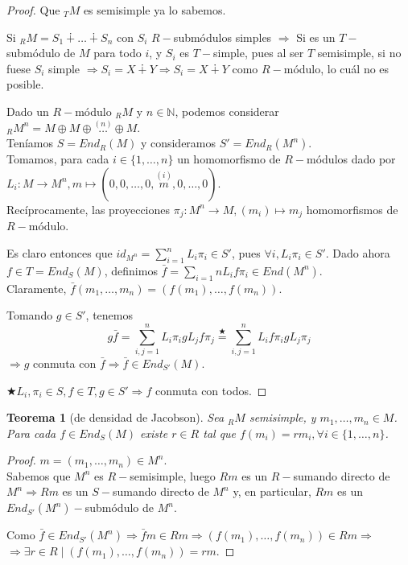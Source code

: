 \documentclass[11pt,a4paper]{article}
\theoremstyle{break}
\newtheorem{theorem}{Teorema}[section]
\begin{document}
\begin{proof}
Que $_{T}M$ es semisimple ya lo sabemos.

Si $_{R}M = S_{1} \dotplus \dots \dotplus S_{n}$ con $S_{i}$ $R-$submódulos simples $\Rightarrow$ Si es un $T-$submódulo de $M$ para todo $i$, y $S_{i}$ es $T-$simple, pues al ser $T$ semisimple, si no fuese $S_{i}$ simple $\Rightarrow S_{i} = X \dotplus Y \Rightarrow S_{i} = X \dotplus Y$ como $R-$módulo, lo cuál no es posible.

Dado un $R-$módulo $_{R}M$ y $n \in \mathbb{N}$, podemos considerar $_{R}M^{n} = M \oplus M \oplus \overset{(n)}{\dots} \oplus M$. \\
Teníamos $S = End_{R}(M)$ y consideramos $S' = End_{R}(M^{n})$. \\
Tomamos, para cada $i \in \{1, \dots, n\}$ un homomorfismo de $R-$módulos dado por $L_{i}: M \to M^{n}, m \mapsto (0, 0, \dots, 0, \overset{(i)}{m}, 0, \dots, 0)$. \\
Recíprocamente, las proyecciones $\pi_{j}: M^{n} \to M, (m_{i}) \mapsto m_{j}$ homomorfismos de $R-$módulo.

Es claro entonces que $id_{M^{n}} = \sum_{i=1}^{n} L_{i} \pi_{i} \in S'$, pues $\forall i, L_{i}\pi_{i} \in S'$. Dado ahora $f \in T = End_{S}(M)$, definimos $\bar{f} = \sum_{i=1}{n} L_{i}f\pi_{i} \in End(M^{n})$. \\
Claramente, $\bar{f}(m_{1}, \dots, m_{n}) = (f(m_{1}), \dots, f(m_{n}))$.

Tomando $g \in S'$, tenemos $$g\bar{f} = \sum_{i, j=1}^{n} L_{i}\pi_{i}gL_{j}f\pi_{j} \overset{\bigstar}{=} \sum_{i, j=1}^{n} L_{i}f\pi_{i}gL_{j}\pi_{j}$$
$\Rightarrow g$ conmuta con $\bar{f} \Rightarrow \bar{f} \in End_{S'}(M)$.

$\bigstar L_{i}, \pi_{i} \in S, f \in T, g \in S' \Rightarrow f$ conmuta con todos.
\end{proof}

\begin{theorem}[de densidad de Jacobson]
Sea $_{R}M$ semisimple, y $m_{1}, \dots, m_{n} \in M$. Para cada $f \in End_{S}(M)$ existe $r \in R$ tal que $f(m_{i}) = rm_{i}, \forall i \in \{1, \dots, n\}$.
\end{theorem}

\begin{proof}
$m = (m_{1}, \dots, m_{n}) \in M^{n}$. \\
Sabemos que $M^{n}$ es $R-$semisimple, luego $Rm$ es un $R-$sumando directo de $M^{n} \Rightarrow Rm$ es un $S-$sumando directo de $M^{n}$ y, en particular, $Rm$ es un $End_{S'}(M^{n})-$submódulo de $M^{n}$.

Como $\bar{f} \in End_{S'}(M^{n}) \Rightarrow \bar{f}m \in Rm \Rightarrow (f(m_{1}), \dots, f(m_{n})) \in Rm \Rightarrow$ \\ $\Rightarrow \exists r \in R \mid (f(m_{1}), \dots, f(m_{n})) = rm$.
\end{proof}
\end{document}
